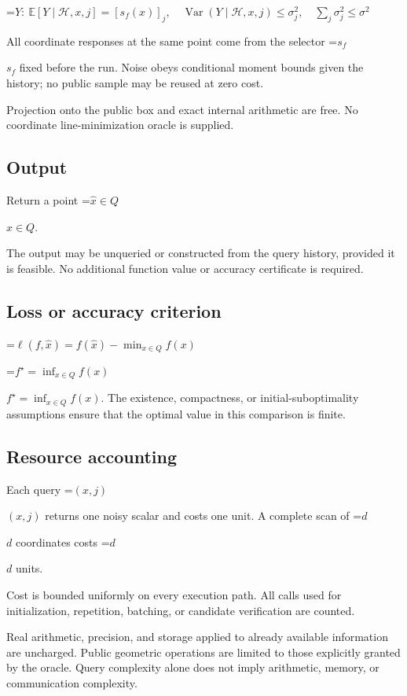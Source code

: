 \documentclass[10pt,a4paper]{article}
\newcommand{\AtlasMath}[1]{\par\begingroup\centering\setbox0=\hbox{$\displaystyle #1$}\ifdim\wd0>1.4\linewidth\typeout{ATLAS WIDE FORMULA: \the\wd0}\fi\ifdim\wd0>\linewidth\resizebox{\linewidth}{!}{\box0}\else\box0\fi\par\endgroup}
\newcommand{\AtlasInlineMath}[1]{\begingroup\setbox0=\hbox{$#1$}\ifdim\wd0>.4\linewidth\endgroup\AtlasMath{#1}\else\endgroup$#1$\fi}
\begin{document}
\AtlasMath{Y:\ \mathbb{E}[Y\mid\mathcal{H},x,j]=[s_f(x)]_j,\quad\operatorname{Var}(Y\mid\mathcal{H},x,j)\le\sigma_j^2,\quad\sum_j\sigma_j^2\le\sigma^2}


All coordinate responses at the same point come from the selector \AtlasInlineMath{s_f} fixed before the run. Noise obeys conditional moment bounds given the history; no public sample may be reused at zero cost.

Projection onto the public box and exact internal arithmetic are free. No coordinate line-minimization oracle is supplied.

\subsection{Output}
Return a point \AtlasInlineMath{\widehat x\in Q}.

The output may be unqueried or constructed from the query history, provided it is feasible. No additional function value or accuracy certificate is required.

\subsection{Loss or accuracy criterion}

\AtlasMath{\ell(f,\widehat{x})=f(\widehat{x})-\min_{x\in Q}f(x)}


\AtlasInlineMath{f^\star=\inf_{x\in Q}f(x)}. The existence, compactness, or initial-suboptimality assumptions ensure that the optimal value in this comparison is finite.

\subsection{Resource accounting}
Each query \AtlasInlineMath{(x,j)} returns one noisy scalar and costs one unit. A complete scan of \AtlasInlineMath{d} coordinates costs \AtlasInlineMath{d} units.

Cost is bounded uniformly on every execution path. All calls used for initialization, repetition, batching, or candidate verification are counted.

Real arithmetic, precision, and storage applied to already available information are uncharged. Public geometric operations are limited to those explicitly granted by the oracle. Query complexity alone does not imply arithmetic, memory, or communication complexity.
\end{document}
